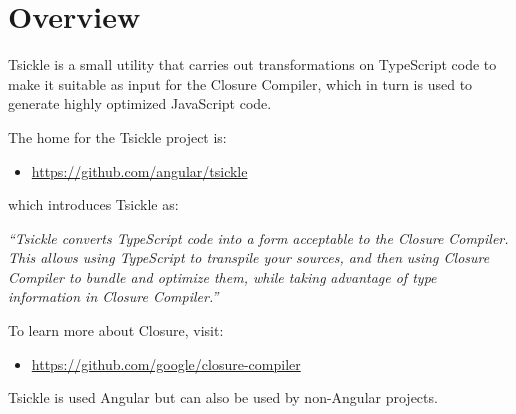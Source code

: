 \section{Overview}

Tsickle is a small utility that carries out transformations on TypeScript code to make it
suitable as input for the Closure Compiler, which in turn is used to generate highly
optimized JavaScript code.

The home for the Tsickle project is:

\begin{itemize}
  \item \url{https://github.com/angular/tsickle}
\end{itemize}

which introduces Tsickle as:

\emph{“Tsickle converts TypeScript code into a form acceptable to the Closure}
\emph{Compiler. This allows using TypeScript to transpile your sources, and then}
\emph{using Closure Compiler to bundle and optimize them, while taking}
\emph{advantage of type information in Closure Compiler.”}

To learn more about Closure, visit:

\begin{itemize}
  \item \url{https://github.com/google/closure-compiler}
\end{itemize}

Tsickle is used Angular but can also be used by non-Angular projects.

